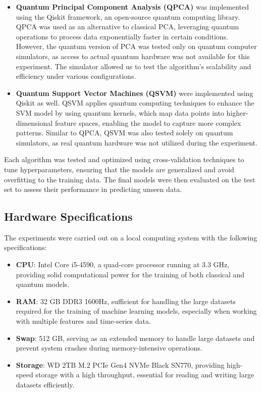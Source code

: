 \documentclass[journal]{IEEEtran}
\begin{document}
\begin{itemize}
    \item \textbf{Quantum Principal Component Analysis (QPCA)} was implemented using the Qiskit framework, an open-source quantum computing library. QPCA was used as an alternative to classical PCA, leveraging quantum operations to process data exponentially faster in certain conditions. However, the quantum version of PCA was tested only on quantum computer simulators, as access to actual quantum hardware was not available for this experiment. The simulator allowed us to test the algorithm’s scalability and efficiency under various configurations.
    \item \textbf{Quantum Support Vector Machines (QSVM)} were implemented using Qiskit as well. QSVM applies quantum computing techniques to enhance the SVM model by using quantum kernels, which map data points into higher-dimensional feature spaces, enabling the model to capture more complex patterns. Similar to QPCA, QSVM was also tested solely on quantum simulators, as real quantum hardware was not utilized during the experiment.
\end{itemize}

Each algorithm was tested and optimized using cross-validation techniques to tune hyperparameters, ensuring that the models are generalized and avoid overfitting to the training data. The final models were then evaluated on the test set to assess their performance in predicting unseen data.

\subsection{Hardware Specifications}

The experiments were carried out on a local computing system with the following specifications:

\begin{itemize}
    \item \textbf{CPU}: Intel Core i5-4590, a quad-core processor running at 3.3 GHz, providing solid computational power for the training of both classical and quantum models.
    \item \textbf{RAM}: 32 GB DDR3 1600Hz, sufficient for handling the large datasets required for the training of machine learning models, especially when working with multiple features and time-series data.
    \item \textbf{Swap}: 512 GB, serving as an extended memory to handle large datasets and prevent system crashes during memory-intensive operations.
    \item \textbf{Storage}: WD 2TB M.2 PCIe Gen4 NVMe Black SN770, providing high-speed storage with a high throughput, essential for reading and writing large datasets efficiently.
\end{itemize}
\end{document}
